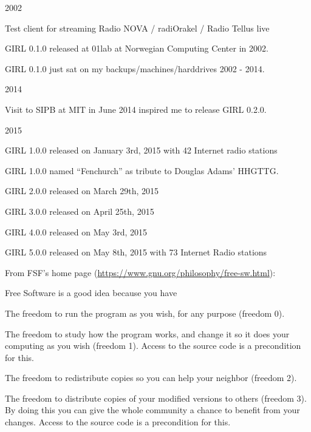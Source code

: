 \documentclass[20pt,landscape]{foils}
\begin{document}
\begin{list1}
\item 2002
  \begin{list2}
  \item Test client for streaming Radio NOVA / radiOrakel / Radio Tellus live
  \item GIRL 0.1.0 released at 01lab at Norwegian Computing Center in 2002.
  \item GIRL 0.1.0 just sat on my backups/machines/harddrives 2002 - 2014.
  \end{list2}
\item 2014
  \begin{list2}
  \item Visit to SIPB at MIT in June 2014 inspired me to release GIRL 0.2.0.
  \end{list2}
\item 2015
  \begin{list2}
    \item GIRL 1.0.0 released on January 3rd, 2015 with 42 Internet radio stations
    \item GIRL 1.0.0 named ``Fenchurch'' as tribute to Douglas Adams' HHGTTG.
    \item GIRL 2.0.0 released on March 29th, 2015
    \item GIRL 3.0.0 released on April 25th, 2015
    \item GIRL 4.0.0 released on May 3rd, 2015
    \item GIRL 5.0.0 released on May 8th, 2015 with 73 Internet Radio stations
  \end{list2}
\end{list1}


From FSF's home page (\url{https://www.gnu.org/philosophy/free-sw.html}):

\begin{list1}
\item Free Software is a good idea because you have
  \begin{list2}
    \item The freedom to run the program as you wish, for any purpose (freedom 0).
    \item The freedom to study how the program works, and change it so it does your computing as you wish (freedom 1). Access to the source code is a precondition for this.
    \item The freedom to redistribute copies so you can help your neighbor (freedom 2).
    \item The freedom to distribute copies of your modified versions to others (freedom 3). By doing this you can give the whole community a chance to benefit from your changes. Access to the source code is a precondition for this.
  \end{list2}
\end{list1}
\end{document}
